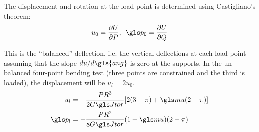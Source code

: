 \documentclass[../../thesis.tex]{subfiles}
\begin{document}
The displacement and rotation at the load point is determined using Castigliano's theorem:
\begin{equation}
u_0 = \frac{\partial U}{\partial P}, \,\,\, \p_0 = \frac{\partial U}{\partial Q}
\end{equation}

This is the ``balanced'' deflection, i.e. the vertical deflections at each load point assuming that the slope $du/d\gls{ang}$ is zero at the supports. In the un-balanced four-point bending test (three points are constrained and the third is loaded), the displacement will be $u_l=2u_0$.
\begin{gather}
\begin{align}
u_l  &= -\frac{PR^3}{2\GJ}[2(3-\pi) + \m(2-\pi)]\\
\p_l &= -\frac{PR^2}{8\GJ}(1+\m)(2-\pi)
\end{align}
\end{gather}
\end{document}

